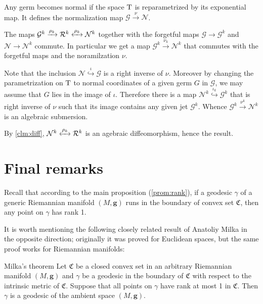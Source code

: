 \documentclass[a4paper,10pt]{article}
\begin{document}
Any germ becomes normal if the space $\mathrm{T}$ is reparametrized by its exponential map.
It defines the normalization map 
$\mathcal{G}\xrightarrow{\nu} \mathcal{N}$.

The maps $\mathcal{G}^k\xrightarrow{\rho_k}\mathcal{R}^k\z{\xleftrightarrow{\rho_k}}\mathcal{N}^k$ together with the forgetful maps $\mathcal{G}\to\mathcal{G}^k$ and $\mathcal{N}\to\mathcal{N}^k$  commute.
In particular we get a map $\mathcal{G}^k\xrightarrow{\nu_k}\mathcal{N}^k$ that commutes with the forgetful maps and the noramilzation $\nu$.

Note that the inclusion $\mathcal{N}\stackrel{\iota}{\hookrightarrow} \mathcal{G}$ is a right inverse of $\nu$.
Moreover by changing the parametrization on $\mathrm{T}$ to normal coordinates of a given germ $G$ in $\mathcal{G}$, we may assume that $G$ lies in the image of $\iota$.
Therefore there is a map $\mathcal{N}^k\stackrel{\iota_k}{\hookrightarrow} \mathcal{G}^k$ that is right inverse of $\nu$ such that its image contains any given jet $\mathcal{G}^k$.
Whence $\mathcal{G}^k\xrightarrow{\nu^k} \mathcal{N}^k$ is an algebraic submersion.

By \ref{clm:diff}, $\mathcal{N}^k\xleftrightarrow{\rho_k}\mathcal{R}^k$ is an agebraic diffeomorphism, hence the result.
\qeds





\section{Final remarks}

Recall that according to the main proposition (\ref{prom:rank}), if a geodesic $\gamma$ of a generic Riemannian manifold $(M,\bm{g})$ runs in the boundary of convex set $\mathfrak{C}$, then any point on $\gamma$ has rank 1.

It is worth mentioning the following closely  related result of Anatoliy Milka \cite[§~4]{milka} in the opposite direction; originally it was proved for Euclidean spaces, but the same proof works for Riemannian manifolds:

\begin{thm}{Milka's theorem}
Let $\mathfrak{C}$ be a closed convex set in an arbitrary Riemannian manifold $(M,\bm{g})$ and $\gamma$ be a geodesic in the boundary of $\mathfrak{C}$ with respect to the intrinsic metric of $\mathfrak {C}$.
Suppose that all points on $\gamma$ have rank at most 1 in $\mathfrak{C}$.
Then $\gamma$ is a geodesic of the ambient space $(M,\bm{g})$.
\end{thm}
\end{document}
